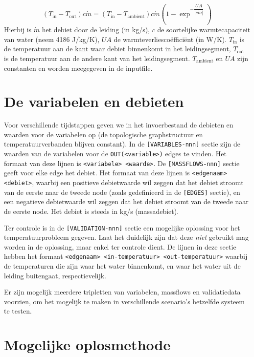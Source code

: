 \documentclass[12pt]{article}
\begin{document}
\begin{equation} \label{form:loss}
(T_\textrm{in} - T_\textrm{out}) c \dot{m} = (T_\textrm{in} - T_\textrm{ambient}) c \dot{m} \left( 1 - \exp^{-\dfrac{UA}{ |c \dot{m}|}} \right) 
\end{equation}
Hierbij is $\dot{m}$ het debiet door de leiding (in kg/s), $c$ de soortelijke warmtecapaciteit van water (neem 4186 J/kg/K), $UA$ de warmteverliescoëfficiënt (in W/K). $T_\textrm{in}$ is de temperatuur aan de kant waar debiet binnenkomt in het leidingsegment, $T_\textrm{out}$ is de temperatuur aan de andere kant van het leidingsegment. $T_\textrm{ambient}$ en $UA$ zijn constanten en worden meegegeven in de inputfile.

\section{De variabelen en debieten}

Voor verschillende tijdstappen geven we in het invoerbestand de debieten en waarden voor de variabelen op (de topologische graphstructuur en temperatuurverbanden blijven constant). In de \verb|[VARIABLES-nnn]| sectie zijn de waarden van de variabelen voor de \verb|OUT(<variable>)| edges te vinden. Het formaat van deze lijnen is \verb|<variabele> <waarde>|. De \verb|[MASSFLOWS-nnn]| sectie geeft voor elke edge het debiet. Het formaat van deze lijnen is \verb|<edgenaam> <debiet>|, waarbij een positieve debietwaarde wil zeggen dat het debiet stroomt van de eerste naar de tweede node (zoals gedefinieerd in de \verb|[EDGES]| sectie), en een negatieve debietwaarde wil zeggen dat het debiet stroomt van de tweede naar de eerste node. Het debiet is steeds in kg/s (massadebiet).

Ter controle is in de \verb|[VALIDATION-nnn]| sectie een mogelijke oplossing voor het temperatuurprobleem gegeven. Laat het duidelijk zijn dat deze \emph{niet} gebruikt mag worden in de oplossing, maar enkel ter controle dient. De lijnen in deze sectie hebben het formaat \verb|<edgenaam> <in-temperatuur> <out-temperatuur>| waarbij de temperaturen die zijn waar het water binnenkomt, en waar het water uit de leiding buitengaat, respectievelijk.

Er zijn mogelijk meerdere tripletten van variabelen, massflows en validatiedata voorzien, om het mogelijk te maken in verschillende scenario's hetzelfde systeem te testen.

\section{Mogelijke oplosmethode}
\end{document}
